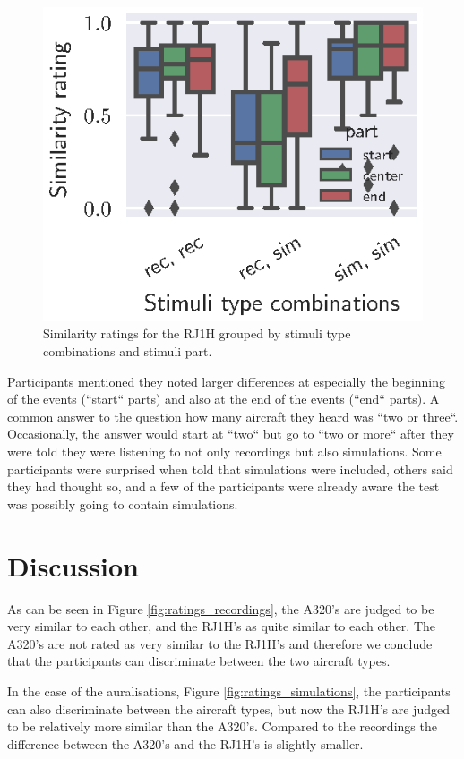 \begin{figure}[H]
  \centering
  \includegraphics[]{../figures/manual/auralisation-paper/figure6_ratings_part_RJ1H}
  \caption{Similarity ratings for the RJ1H grouped by stimuli type combinations and stimuli part.}
  \label{fig:ratings_part_RJ1H}
\end{figure}

Participants mentioned they noted larger differences at especially the beginning
of the events (``start`` parts) and also at the end of the events (``end`` parts). A
common answer to the question how many aircraft they heard was ``two or three``.
Occasionally, the answer would start at ``two`` but go to ``two or more`` after they
were told they were listening to not only recordings but also simulations. Some
participants were surprised when told that simulations were included,
others said they had thought so, and a few of the participants were already
aware the test was possibly going to contain simulations.

\section{Discussion}
As can be seen in Figure \ref{fig:ratings_recordings}, the A320's are judged to be very
similar to each other, and the RJ1H's as quite similar to each other. The A320's
are not rated as very similar to the RJ1H's and therefore we conclude that the
participants can discriminate between the two aircraft types.

In the case of the auralisations, Figure \ref{fig:ratings_simulations}, the
participants can also discriminate between the aircraft types, but now the
RJ1H's are judged to be relatively more similar than the A320's. Compared to the recordings
the difference between the A320's and the RJ1H's is slightly smaller.

